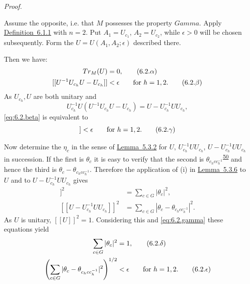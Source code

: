 \documentclass[b5paper,twoside]{article}
\newcommand{\lemref}[2]{\hyperref[#1]{\mbox{Lemma~#2}}}
\newcommand{\defref}[2]{\hyperref[#1]{\mbox{Definition~#2}}}
\theoremstyle{mvnplain}
\renewenvironment{proof}[1][Proof]{%
  \par\addvspace{0.35\baselineskip}%
  \noindent\textit{#1.}\ \normalfont\ignorespaces
}{%
  \par\addvspace{0.35\baselineskip}%
}
\newcommand{\M}{\mathbf M}
\newcommand{\Metric}[1]{\left[\!\left[#1\right]\!\right]}
\def\M{M}%
\def\Metric#1{[[#1]]}%
\def\Gamma{Gamma}%
\def\operatorname#1{#1}%
\def\mathfrak#1{#1}%
\begin{document}
\begin{proof}
Assume the opposite, i.e. that $\M$ possesses the property $\Gamma$. Apply
\defref{def:6.1.1}{6.1.1} with $n=2$. Put $A_1=U_{c_1}$,
$A_2=U_{c_2}$, while $\epsilon>0$ will be chosen subsequently. Form the
$U=U(A_1,A_2;\epsilon)$ described there.

Then we have:
\begin{align}
  \operatorname{Tr}_{\M}(U)&=0,
    \tag{6.2.\ensuremath{\alpha}}\label{eq:6.2.alpha}\\
  \Metric{U^{-1}U_{c_h}U-U_{c_h}}&<\epsilon
    \qquad\text{for }h=1,2.
    \tag{6.2.\ensuremath{\beta}}\label{eq:6.2.beta}
\end{align}
As $U_{c_h},U$ are both unitary and
\[
  U_{c_h}^{-1}U(U^{-1}U_{c_h}U-U_{c_h})
  =U-U_{c_h}^{-1}UU_{c_h},
\]
\eqref{eq:6.2.beta} is equivalent to
\begin{equation}
  \Metric{U-U_{c_h}^{-1}UU_{c_h}}<\epsilon
  \qquad\text{for }h=1,2.
  \tag{6.2.\ensuremath{\gamma}}\label{eq:6.2.gamma}
\end{equation}

Now determine the $\eta_c$ in the sense of \lemref{lem:5.3.2}{5.3.2} for
$U$, $U_{c_h}^{-1}UU_{c_h}$, $U-U_{c_h}^{-1}UU_{c_h}$ in succession. If the
first is $\theta_c$ it is easy to verify that the second is
$\theta_{c_hcc_h^{-1}}$\textsuperscript{\hyperref[fn:50]{50}} and hence the third is
$\theta_c-\theta_{c_hcc_h^{-1}}$. Therefore the application of (i) in
\lemref{lem:5.3.6}{5.3.6} to $U$ and to $U-U_{c_h}^{-1}UU_{c_h}$ gives
\begin{align*}
  \Metric{U}^{2}&=\sum_{c\in\mathfrak G}|\theta_c|^2,\\
  \Metric{U-U_{c_h}^{-1}UU_{c_h}}^{2}
    &=\sum_{c\in\mathfrak G}
      |\theta_c-\theta_{c_hcc_h^{-1}}|^2.
\end{align*}
As $U$ is unitary, $\Metric{U}^{2}=1$. Considering this and
\eqref{eq:6.2.gamma} these equations yield
\begin{align}
  \sum_{c\in\mathfrak G}|\theta_c|^2&=1,
    \tag{6.2.\ensuremath{\delta}}\label{eq:6.2.delta}\\
  \left(\sum_{c\in\mathfrak G}
  |\theta_c-\theta_{c_hcc_h^{-1}}|^2\right)^{1/2}&<\epsilon
    \qquad\text{for }h=1,2.
    \tag{6.2.\ensuremath{\epsilon}}\label{eq:6.2.epsilon}
\end{align}


\end{proof}
\end{document}
